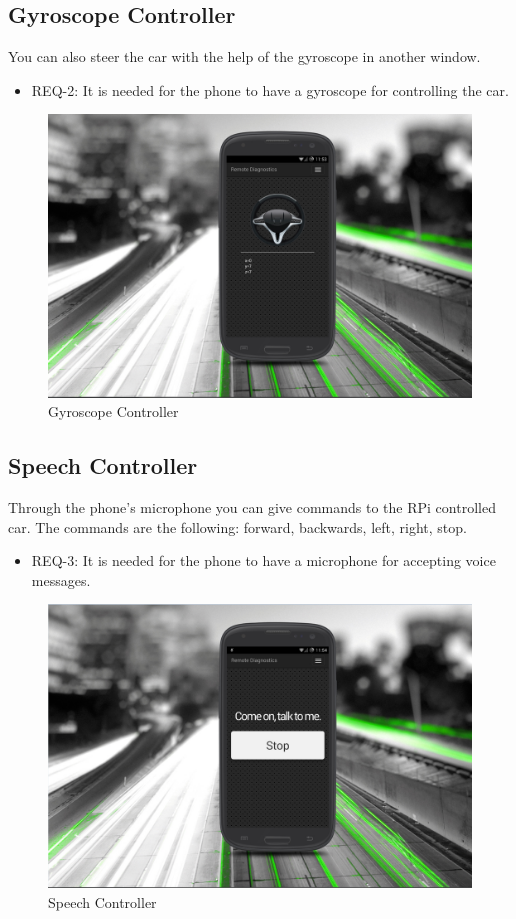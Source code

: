 \documentclass{scrreprt}
\begin{document}
\subsection{Gyroscope Controller}
You can also steer the car with the help of the gyroscope in another window.

\begin{itemize}
\item REQ-2: It is needed for the phone to have a gyroscope for controlling the car. 
\end{itemize}
 
\begin{figure}[!htbp]
\center
\includegraphics[width=1\textwidth]{./img/gyroController.jpg}
Gyroscope Controller
\end{figure}

\subsection{Speech Controller}
Through the phone's microphone you can give commands to the RPi controlled car. The commands are the following: forward, backwards, left, right, stop.
\begin{itemize}
\item REQ-3: It is needed for the phone to have a microphone for accepting voice messages.
\end{itemize}
\begin{figure}[!htbp]
\center
\includegraphics[width=1\textwidth]{./img/speechController.jpg}
Speech Controller
\end{figure}
\end{document}
